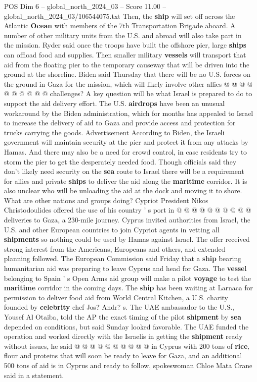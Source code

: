 \begin{textsample}{POS Dim 6 – global\_north\_2024\_03 – Score 11.00 – global\_north\_2024\_03/106544075.txt}
Then, the \textbf{ship} will set off across the Atlantic \textbf{Ocean} with members of the 7th Transportation Brigade aboard.
A number of other military units from the U.S. and abroad will also take part in the mission.
Ryder said once the troops have built the offshore pier, large \textbf{ships} can offload food and supplies.
Then smaller military \textbf{vessels} will transport that aid from the floating pier to the temporary causeway that will be driven into the ground at the shoreline.
Biden said Thursday that there will be no U.S. forces on the ground in Gaza for the mission, which will likely involve other allies @ @ @ @ @ @ @ @ @ @ challenges?
A key question will be what Israel is prepared to do to support the aid delivery effort.
The U.S. \textbf{airdrops} have been an unusual workaround by the Biden administration, which for months has appealed to Israel to increase the delivery of aid to Gaza and provide access and protection for trucks carrying the goods.
Advertisement According to Biden, the Israeli government will maintain security at the pier and protect it from any attacks by Hamas.
And there may also be a need for crowd control, in case residents try to storm the pier to get the desperately needed food.
Though officials said they don't likely need security on the \textbf{sea} route to Israel there will be a requirement for allies and private \textbf{ships} to deliver the aid along the \textbf{maritime} corridor.
It is also unclear who will be unloading the aid at the dock and moving it to shore.
What are other nations and groups doing?
Cypriot President Nikos Christodoulides offered the use of his country ' s port in @ @ @ @ @ @ @ @ @ @ deliveries to Gaza, a 230-mile journey.
Cyprus invited authorities from Israel, the U.S. and other European countries to join Cypriot agents in vetting all \textbf{shipments} so nothing could be used by Hamas against Israel.
The offer received strong interest from the Americans, Europeans and others, and extended planning followed.
The European Commission said Friday that a \textbf{ship} bearing humanitarian aid was preparing to leave Cyprus and head for Gaza.
The \textbf{vessel} belonging to Spain ' s Open Arms aid group will make a pilot \textbf{voyage} to test the \textbf{maritime} corridor in the coming days.
The \textbf{ship} has been waiting at Larnaca for permission to deliver food aid from World Central Kitchen, a U.S. charity founded by \textbf{celebrity} chef Jos?
Andr? s.
The UAE ambassador to the U.S., Yousef Al Otaiba, told the AP the exact timing of the pilot \textbf{shipment} by \textbf{sea} depended on conditions, but said Sunday looked favorable.
The UAE funded the operation and worked directly with the Israelis in getting the \textbf{shipment} ready without issues, he said @ @ @ @ @ @ @ @ @ @ in Cyprus with 200 tons of \textbf{rice}, flour and proteins that will soon be ready to leave for Gaza, and an additional 500 tons of aid is in Cyprus and ready to follow, spokeswoman Chloe Mata Crane said in a statement.

\end{textsample}
